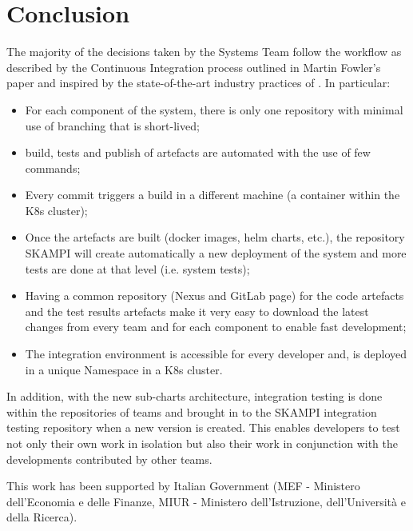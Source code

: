 \documentclass[a4paper]{spie}  %
\begin{document}
\section{Conclusion}
The majority of the decisions taken by the Systems Team follow the workflow as described by the Continuous Integration process outlined in Martin Fowler’s paper and inspired by the state-of-the-art industry practices of \cite{DevOps, CI, CD}. In particular:
\begin{itemize}
    \item For each component of the system, there is only one repository with minimal use of branching that is short-lived;
    \item build, tests and publish of artefacts are automated with the use of few commands;
    \item Every commit triggers a build in a different machine (a container within the K8s cluster);
    \item Once the artefacts are built (docker images, helm charts, etc.), the repository SKAMPI will create automatically a new deployment of the system and more tests are done at that level (i.e. system tests);
    \item Having a common repository (Nexus and GitLab page) for the code artefacts and the test results artefacts make it very easy to download the latest changes from every team and for each component to enable fast development;
    \item The integration environment is accessible for every developer and, is deployed in a unique Namespace in a K8s cluster.
\end{itemize}

In addition, with the new sub-charts architecture, integration testing is done within the repositories of teams and brought in to the SKAMPI integration testing repository when a new version is created.  This enables developers to test not only their own work in isolation but also their work in conjunction with the developments contributed by other teams.

\acknowledgments %

This work has been supported by Italian Government (MEF - Ministero dell'Economia e delle Finanze, MIUR - Ministero dell'Istruzione, dell'Università e della Ricerca).

\end{document}
